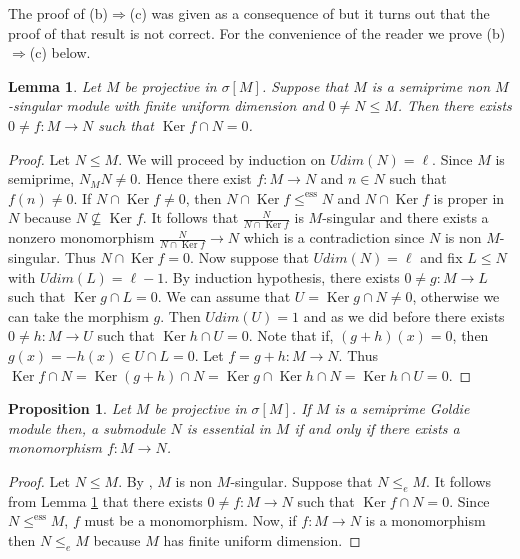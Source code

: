 \documentclass{amsart}
\newtheorem{lemma}[thm]{Lemma}
\newtheorem{prop}[thm]{Proposition}
\theoremstyle{definition}
\theoremstyle{remark}
\numberwithin{equation}{section}
\DeclareMathOperator{\Ker}{Ker}
\newcommand{\sm}{\sigma[M]}
\newcommand{\ess}{\leq^\text{ess}}
\begin{document}
	The proof of (b)$\Rightarrow$(c) was given as a consequence of \cite[Proposition 3.13]{PepeKrull} but it turns out that the proof of that result is not correct. For the convenience of the reader we prove (b)$\Rightarrow$(c) below.
	
	\begin{lemma}\label{spnmskern0}
		Let $M$ be projective in $\sm$. Suppose that $M$ is a semiprime non $M$-singular module with finite uniform dimension and $0\neq N\leq M$. Then there exists $0\neq f:M\to N$ such that $\Ker f\cap N=0$.
	\end{lemma}
		
	\begin{proof}
		Let $N\leq M$. We will proceed by induction on $Udim(N)=\ell$. Since $M$ is semiprime, $N_MN\neq 0$. Hence there exist $f:M\to N$ and $n\in N$ such that $f(n)\neq 0$. If $N\cap \Ker f\neq 0$, then $N\cap \Ker f\ess N$ and $N\cap \Ker f$ is proper in $N$ because $N\nsubseteq \Ker f$. It follows that $\frac{N}{N\cap \Ker f}$ is $M$-singular and there exists a nonzero monomorphism $\frac{N}{N\cap \Ker f}\to N$ which is a contradiction since $N$ is non $M$-singular. Thus $N\cap \Ker f=0$. Now suppose that $Udim(N)=\ell$ and fix $L\leq N$ with $Udim(L)=\ell-1$. By induction hypothesis, there exists $0\neq g:M\to L$ such that $\Ker g\cap L=0$. We can assume that $U=\Ker g\cap N\neq 0$, otherwise we can take the morphism $g$. Then $Udim(U)=1$ and as we did before there exists $0\neq h:M\to U$ such that $\Ker h\cap U=0$. Note that if, $(g+h)(x)=0$, then $g(x)=-h(x)\in U\cap L=0$. Let $f=g+h:M\to N$. Thus $\Ker f\cap N=\Ker(g+h)\cap N=\Ker g\cap \Ker h\cap N=\Ker h\cap U=0$.
	\end{proof}
	
	\begin{prop}
		Let $M$ be projective in $\sm$. If $M$ is a semiprime Goldie module then, a submodule $N$ is essential in $M$ if and only if there exists a monomorphism $f:M\to N$.
	\end{prop} 
	
	\begin{proof}
		Let $N\leq{M}$. By \cite[Proposition 3.4]{PepeKrull}, $M$ is non $M$-singular. Suppose that $N\leq_e{M}$. It follows from Lemma \ref{spnmskern0} that there exists $0\neq f:M\to N$ such that $\Ker f\cap N=0$. Since $N\ess M$, $f$ must be a monomorphism. Now, if $f:M\rightarrow{N}$ is a monomorphism then $N\leq_e{M}$ because $M$ has finite uniform dimension.	
	\end{proof}
	
\end{document}
